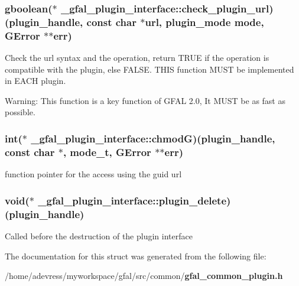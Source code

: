 \subsubsection{\setlength{\rightskip}{0pt plus 5cm}gboolean($\ast$ \bf{\_\-gfal\_\-plugin\_\-interface::check\_\-plugin\_\-url})(plugin\_\-handle, const char $\ast$url, plugin\_\-mode mode, GError $\ast$$\ast$err)}\label{struct__gfal__plugin__interface_e1ab2d2c3ea35095446a2c14734b5f4c}


Check the url syntax and the operation, return TRUE if the operation is compatible with the plugin, else FALSE. THIS function MUST be implemented in EACH plugin. \begin{Desc}
\item[Warning:]This function is a key function of GFAL 2.0, It MUST be as fast as possible. \end{Desc}
\subsubsection{\setlength{\rightskip}{0pt plus 5cm}int($\ast$ \bf{\_\-gfal\_\-plugin\_\-interface::chmod\-G})(plugin\_\-handle, const char $\ast$, mode\_\-t, GError $\ast$$\ast$err)}\label{struct__gfal__plugin__interface_e032ec6f13423ea516ca4c02332f5ecf}


function pointer for the access using the guid url 
\subsubsection{\setlength{\rightskip}{0pt plus 5cm}void($\ast$ \bf{\_\-gfal\_\-plugin\_\-interface::plugin\_\-delete})(plugin\_\-handle)}\label{struct__gfal__plugin__interface_d146f62bd310f1f265f0bc3c37cc70d8}


Called before the destruction of the plugin interface 

The documentation for this struct was generated from the following file:\begin{CompactItemize}
\item 
/home/adevress/myworkspace/gfal/src/common/\bf{gfal\_\-common\_\-plugin.h}\end{CompactItemize}
